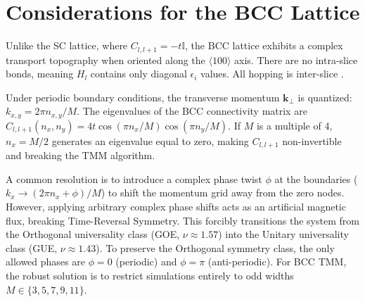 \documentclass[11pt,a4paper]{article}
\begin{document}
\section{Considerations for the BCC Lattice}

Unlike the SC lattice, where $C_{l, l+1} = -t\mathbb{I}$, the BCC lattice exhibits a complex transport topography when oriented along the $\langle 100 \rangle$ axis. There are no intra-slice bonds, meaning $H_l$ contains only diagonal $\epsilon_i$ values. All hopping is inter-slice \cite{Eilmes2008}.

Under periodic boundary conditions, the transverse momentum $\mathbf{k}_{\perp}$ is quantized: $k_{x,y} = 2\pi n_{x,y}/M$. The eigenvalues of the BCC connectivity matrix are $C_{l, l+1}(n_x, n_y) = 4t \cos(\pi n_x/M) \cos(\pi n_y/M)$. If $M$ is a multiple of 4, $n_x = M/2$ generates an eigenvalue equal to zero, making $C_{l,l+1}$ non-invertible and breaking the TMM algorithm.

A common resolution is to introduce a complex phase twist $\phi$ at the boundaries ($k_x \to (2\pi n_x + \phi)/M$) to shift the momentum grid away from the zero nodes. However, applying arbitrary complex phase shifts acts as an artificial magnetic flux, breaking Time-Reversal Symmetry. This forcibly transitions the system from the Orthogonal universality class (GOE, $\nu \approx 1.57$) into the Unitary universality class (GUE, $\nu \approx 1.43$). To preserve the Orthogonal symmetry class, the only allowed phases are $\phi=0$ (periodic) and $\phi=\pi$ (anti-periodic). For BCC TMM, the robust solution is to restrict simulations entirely to odd widths $M \in \{3, 5, 7, 9, 11\}$.







\end{document}
